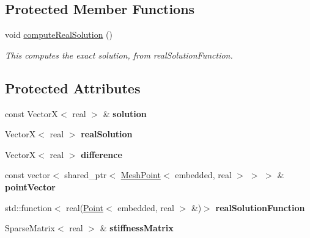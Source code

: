 \subsection*{Protected Member Functions}
\begin{DoxyCompactItemize}
\item 
void \hyperlink{class_error_af104f894c3a83e26b85cc7a5f429dc21}{compute\+Real\+Solution} ()\hypertarget{class_error_af104f894c3a83e26b85cc7a5f429dc21}{}\label{class_error_af104f894c3a83e26b85cc7a5f429dc21}

\begin{DoxyCompactList}\small\item\em This computes the exact solution, from real\+Solution\+Function. \end{DoxyCompactList}\end{DoxyCompactItemize}
\subsection*{Protected Attributes}
\begin{DoxyCompactItemize}
\item 
const VectorX$<$ real $>$ \& {\bfseries solution}\hypertarget{class_error_a63e5ca94bf6ee10b531ae41fc1784ba9}{}\label{class_error_a63e5ca94bf6ee10b531ae41fc1784ba9}

\item 
VectorX$<$ real $>$ {\bfseries real\+Solution}\hypertarget{class_error_a6fb9cc85ec7ed04f99bbc487d1201986}{}\label{class_error_a6fb9cc85ec7ed04f99bbc487d1201986}

\item 
VectorX$<$ real $>$ {\bfseries difference}\hypertarget{class_error_afb2549d0b0a6bfa0f81ea93a396fd462}{}\label{class_error_afb2549d0b0a6bfa0f81ea93a396fd462}

\item 
const vector$<$ shared\+\_\+ptr$<$ \hyperlink{class_mesh_point}{Mesh\+Point}$<$ embedded, real $>$ $>$ $>$ \& {\bfseries point\+Vector}\hypertarget{class_error_abd75537e1d612c8f7b0ce238dc71d09a}{}\label{class_error_abd75537e1d612c8f7b0ce238dc71d09a}

\item 
std\+::function$<$ real(\hyperlink{class_point}{Point}$<$ embedded, real $>$ \&)$>$ {\bfseries real\+Solution\+Function}\hypertarget{class_error_a9d0a0cfde3657a02ce55308a947543ee}{}\label{class_error_a9d0a0cfde3657a02ce55308a947543ee}

\item 
Sparse\+Matrix$<$ real $>$ \& {\bfseries stiffness\+Matrix}\hypertarget{class_error_abe45bf80209efc5704dd6311c24fbc53}{}\label{class_error_abe45bf80209efc5704dd6311c24fbc53}

\end{DoxyCompactItemize}


